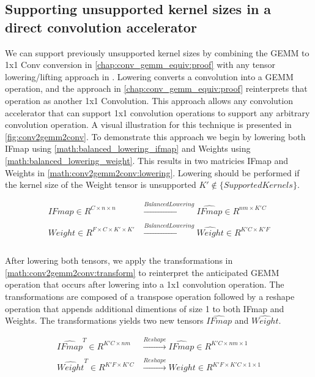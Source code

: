 \subsection{Supporting unsupported kernel sizes in a direct convolution accelerator}
\label{chap:conv_gemm_equiv:application}

We can support previously unsupported kernel sizes by combining the GEMM to 1x1
Conv conversion in \autoref{chap:conv_gemm_equiv:proof} with any tensor
lowering/lifting approach in \cite{cafe_con_troll}. Lowering converts a
convolution into a GEMM operation, and the approach in
\autoref{chap:conv_gemm_equiv:proof} reinterprets that operation as another 1x1
Convolution. This approach allows any convolution accelerator that can support
1x1 convolution operations to support any arbitrary convolution operation. A
visual illustration for this technique is presented in \autoref{fig:conv2gemm2conv}.
To demonstrate this approach we begin by lowering both IFmap using
\autoref{math:balanced_lowering_ifmap} and Weights using
\autoref{math:balanced_lowering_weight}. This results in two matricies IFmap and
Weights in \autoref{math:conv2gemm2conv:lowering}. Lowering should be performed
if the kernel size of the Weight tensor is unsupported $K' \notin
\{SupportedKernels\}$. 

\begin{equation}
    \begin{aligned}
        IFmap \in R^{C\times n\times n} & \xrightarrow[]{Balanced Lowering} \hat{IFmap} \in R^{nm\times K'C} \\
        Weight \in R^{F\times C\times K' \times K'} & \xrightarrow[]{Balanced Lowering} \hat{Weight} \in R^{K'C\times K'F} \\
    \end{aligned}
    \label{math:conv2gemm2conv:lowering}
\end{equation}

After lowering both tensors, we apply the transformations in
\autoref{math:conv2gemm2conv:transform} to reinterpret the anticipated GEMM
operation that occurs after lowering into a 1x1 convolution operation. The
transformations are composed of a transpose operation followed by a reshape
operation that appends additional dimentions of size 1 to both IFmap and
Weights. The transformations yields two new tensors $\hat{IFmap}$ and
$\hat{Weight}$.

\begin{equation}
    \begin{aligned}
        \hat{IFmap}^T \in R^{K'C \times nm} & \xrightarrow[]{Reshape} \hat{IFmap} \in R^{K'C \times nm \times 1} \\
        \hat{Weight}^T \in R^{K'F\times K'C} & \xrightarrow[]{Reshape} Weight \in R^{K'F\times K'C \times 1 \times 1} \\
        \end{aligned}
    \label{math:conv2gemm2conv:transform}
\end{equation}

